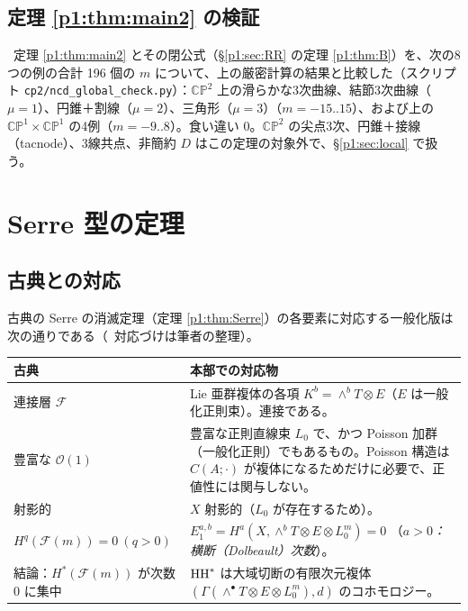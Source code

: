 \subsection{定理 \ref{p1:thm:main2} の検証}
\tV\ 定理 \ref{p1:thm:main2} とその閉公式（\S\ref{p1:sec:RR} の定理 \ref{p1:thm:B}）を、次の8つの例の合計 196 個の $m$ について、上の厳密計算の結果と比較した（スクリプト \texttt{cp2/ncd\_global\_check.py}）：$\mathbb{CP}^2$ 上の滑らかな3次曲線、結節3次曲線（$\mu=1$）、円錐＋割線（$\mu=2$）、三角形（$\mu=3$）（$m=-15..15$）、および上の $\mathbb{CP}^1\times\mathbb{CP}^1$ の4例（$m=-9..8$）。食い違い 0。$\mathbb{CP}^2$ の尖点3次、円錐＋接線（tacnode）、3線共点、非簡約 $D$ はこの定理の対象外で、\S\ref{p1:sec:local} で扱う。
\section{Serre 型の定理}\label{p1:sec:serre}
\subsection{古典との対応}
古典の Serre の消滅定理（定理 \ref{p1:thm:Serre}）の各要素に対応する一般化版は次の通りである（\tK\ 対応づけは筆者の整理）。
\begin{center}\small
\begin{tabular}{p{4.6cm}p{9.8cm}}\toprule
古典 & 本部での対応物\\\midrule
連接層 $\mathcal F$ & Lie 亜群複体の各項 $K^b=\wedge^bT\otimes E$（$E$ は一般化正則束）。連接である。\\
豊富な $\mathcal O(1)$ & 豊富な正則直線束 $L_0$ で、かつ Poisson 加群（一般化正則）でもあるもの。Poisson 構造は $C(A;\cdot)$ が複体になるためだけに必要で、正値性には関与しない。\\
射影的 & $X$ 射影的（$L_0$ が存在するため）。\\
$H^q(\mathcal F(m))=0\ (q>0)$ & $E_1^{a,b}=H^a(X,\wedge^bT\otimes E\otimes L_0^m)=0$ （\emph{$a>0$：横断（Dolbeault）次数}）。\\
結論：$H^*(\mathcal F(m))$ が次数 0 に集中 & $\mathrm{HH}^*$ は大域切断の有限次元複体 $(\Gamma(\wedge^\bullet T\otimes E\otimes L_0^m),d)$ のコホモロジー。\\\bottomrule
\end{tabular}
\end{center}

